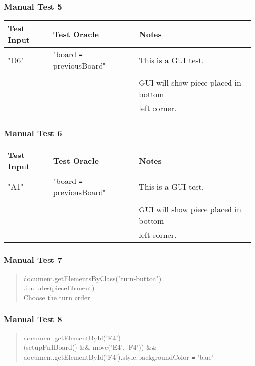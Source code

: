 \documentclass[11pt]{article}
\begin{document}
\subsubsection{Manual Test 5}
\label{sec:orgb189415}
\begin{center}
\begin{tabular}{|p{4.0cm}|p{6.0cm}|p{3.0cm}|}
Test Input & Test Oracle & Notes\\
\hline
"D6" & "board \texttt{=} previousBoard" & This is a GUI test.\\
 &  & \\
 &  & GUI will show piece placed in bottom\\
 &  & left corner.\\
\end{tabular}
\end{center}
\subsubsection{Manual Test 6}
\label{sec:orgc8d62ce}
\begin{center}
\begin{tabular}{|p{4.0cm}|p{6.0cm}|p{3.0cm}|}
Test Input & Test Oracle & Notes\\
\hline
"A1" & "board \texttt{=} previousBoard" & This is a GUI test.\\
 &  & \\
 &  & GUI will show piece placed in bottom\\
 &  & left corner.\\
\end{tabular}
\end{center}
\subsubsection{Manual Test 7}
\label{sec:org6694017}
\begin{verse}
document.getElementsByClass("turn-button")\\
[\ldots{}].includes(pieceElement)\\
Choose the turn order\\
\end{verse}

\subsubsection{Manual Test 8}
\label{sec:org194582a}
\begin{verse}
document.getElementById('E4')\\
(setupFullBoard() \&\& move('E4', 'F4')) \&\& document.getElementById('F4').style.backgroundColor \texttt{=} 'blue'\\
\end{verse}
\end{document}
